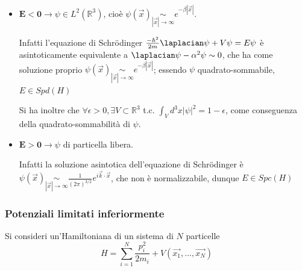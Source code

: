 \begin{itemize}
    \item $\mathbf{E<0} \to \psi\in L^2(\mathbb{R}^3)$, cioè 
	$\psi(\vec{x}) \underset{|\vec{x}|\to\infty}\sim e^{-\beta |\vec{x}|}$.
	
	Infatti l'equazione di Schrödinger
	$\frac{-\hbar^2}{2m}\laplacian\psi+V\psi=E\psi$ è asintoticamente equivalente
	a $\laplacian\psi - \alpha^2\psi \sim 0$, che ha come soluzione proprio
	$\psi(\vec{x}) \underset{|\vec{x}|\to\infty}\sim e^{-\beta |\vec{x}|}$;
	essendo $\psi$ quadrato-sommabile, $E\in Spd(H)$
    
	Si ha inoltre che $\forall \epsilon>0, \exists V\subset\mathbb{R}^3$ t.c.
	$\int_{V}^{}d^3x|\psi|^2 = 1-\epsilon$, come conseguenza della
	quadrato-sommabilità di $\psi$.
    \item $\mathbf{E>0} \to \psi$ di particella libera.

	Infatti la soluzione asintotica dell'equazione di Schrödinger è
	$\psi(\vec{x})\underset{|\vec{x}|\to\infty}\sim
	\frac{1}{(2\pi)^{3/2}}e^{i\vec{k}\cdot\vec{x}}$, che non è normalizzabile,
	dunque $E\in Spc(H)$
\end{itemize}
\subsubsection{Potenziali limitati inferiormente}
Si consideri un'Hamiltoniana di un sistema di $N$ particelle 
$$H = \sum_{i=1}^{N}\frac{p_i^2}{2m_i}+ V(\vec{x_1},...,\vec{x_N})$$


